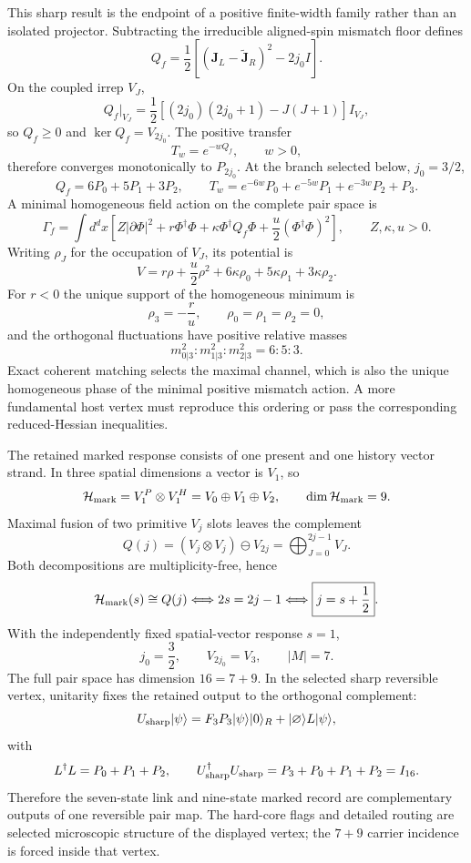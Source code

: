 \documentclass[11pt]{article}
\begin{document}
This sharp result is the endpoint of a positive finite-width family rather than an isolated projector. Subtracting the irreducible aligned-spin mismatch floor defines
\[
Q_f
=\frac12\left[(\mathbf J_L-\widetilde{\mathbf J}_R)^2-2j_0I\right].
\]
On the coupled irrep $V_J$,
\[
Q_f\big|_{V_J}
=\frac12\left[(2j_0)(2j_0+1)-J(J+1)\right]I_{V_J},
\]
so $Q_f\ge0$ and $\ker Q_f=V_{2j_0}$. The positive transfer
\[
T_w=e^{-wQ_f},\qquad w>0,
\]
therefore converges monotonically to $P_{2j_0}$. At the branch selected below, $j_0=3/2$,
\[
\boxed{Q_f=6P_0+5P_1+3P_2},
\qquad
\boxed{T_w=e^{-6w}P_0+e^{-5w}P_1+e^{-3w}P_2+P_3}.
\]
A minimal homogeneous field action on the complete pair space is
\[
\Gamma_f=\int d^dx\left[
Z|\partial\Phi|^2+r\Phi^\dagger\Phi
+\kappa\Phi^\dagger Q_f\Phi
+\frac u2(\Phi^\dagger\Phi)^2\right],
\qquad Z,\kappa,u>0.
\]
Writing $\rho_J$ for the occupation of $V_J$, its potential is
\[
V=r\rho+\frac u2\rho^2+6\kappa\rho_0+5\kappa\rho_1+3\kappa\rho_2.
\]
For $r<0$ the unique support of the homogeneous minimum is
\[
\boxed{\rho_3=-\frac ru,\qquad \rho_0=\rho_1=\rho_2=0},
\]
and the orthogonal fluctuations have positive relative masses
\[
\boxed{m_{0|3}^2:m_{1|3}^2:m_{2|3}^2=6:5:3}.
\]
Exact coherent matching selects the maximal channel, which is also the unique homogeneous phase of the minimal positive mismatch action. A more fundamental host vertex must reproduce this ordering or pass the corresponding reduced-Hessian inequalities.

The retained marked response consists of one present and one history vector strand. In three spatial dimensions a vector is $V_1$, so
\[
\mathcal H_{\rm mark}=V_1^P\otimes V_1^H
=V_0\oplus V_1\oplus V_2,
\qquad \dim\mathcal H_{\rm mark}=9.
\]
Maximal fusion of two primitive $V_j$ slots leaves the complement
\[
Q(j)=\left(V_j\otimes V_j\right)\ominus V_{2j}
=\bigoplus_{J=0}^{2j-1}V_J.
\]
Both decompositions are multiplicity-free, hence
\[
\mathcal H_{\rm mark}(s)\cong Q(j)
\Longleftrightarrow 2s=2j-1
\Longleftrightarrow
\boxed{j=s+\frac12}.
\]
With the independently fixed spatial-vector response $s=1$,
\[
\boxed{j_0=\frac32},\qquad
\boxed{V_{2j_0}=V_3},\qquad
\boxed{|M|=7}.
\]
The full pair space has dimension $16=7+9$. In the selected sharp reversible vertex, unitarity fixes the retained output to the orthogonal complement:
\[
U_{\rm sharp}|\psi\rangle
=F_3P_3|\psi\rangle|0\rangle_R
+|\varnothing\rangle L|\psi\rangle,
\]
with
\[
L^\dagger L=P_0+P_1+P_2,
\qquad
U_{\rm sharp}^\dagger U_{\rm sharp}=P_3+P_0+P_1+P_2=I_{16}.
\]
Therefore the seven-state link and nine-state marked record are complementary outputs of one reversible pair map. The hard-core flags and detailed routing are selected microscopic structure of the displayed vertex; the $7+9$ carrier incidence is forced inside that vertex.
\end{document}

